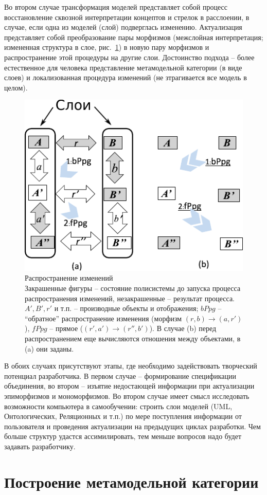 \documentclass[12pt,a4paper]{ltxdoc}
\begin{document}
Во втором случае трансформация моделей представляет собой процесс восстановление сквозной интерпретации концептов и стрелок в расслоении, в случае, если одна из моделей (слой) подверглась изменению.  Актуализация представляет собой преобразование пары морфизмов (межслойная интерпретация; измененная структура в слое, рис.~\ref{fig:propagation}) в новую пару морфизмов и распространение этой процедуры на другие слои.  Достоинство подхода -- более естественное для человека представление метамодельной категории (в виде слоев) и локализованная процедура изменений (не зтрагивается все модель в целом).


\begin{figure}[htbp]
  \centering
  \includegraphics[width=0.5\linewidth]{propagation}
  \caption{Распространение изменений\\[0.3em]
    \footnotesize{Закрашенные фигуры -- состояние полисистемы до запуска
      процесса распространения изменений, незакрашенные -- результат процесса.
      $A',B',r'$ и т.п. -- производные объекты и отображения; $bPpg$ --
      ``обратное'' распространение изменения (морфизм $(r,b)\to (a,r')$), $fPpg$
      -- прямое ($(r',a')\to (r'',b')$).  В случае (b) перед распространением
      еще вычисляются отношения между объектами, в (a) они заданы.}}
  \label{fig:propagation}
\end{figure}


В обоих случаях присутствуют этапы, где необходимо задействовать творческий потенциал разработчика.  В первом случае -- формирование спецификации объединения, во втором -- изъятие недостающей информации при актуализации эпиморфизмов и мономорфизмов.  Во втором случае имеет смысл исследовать возможности компьютера в самообучении: строить слои моделей (UML, Онтологических, Реляционных и т.п.) по мере поступления информации от пользователя и проведения актуализации на предыдущих циклах разработки.  Чем больше структур удастся ассимилировать, тем меньше вопросов надо будет задавать разработчику.

\section{Построение метамодельной категории}
\label{sec:mmod-construction}
\end{document}
